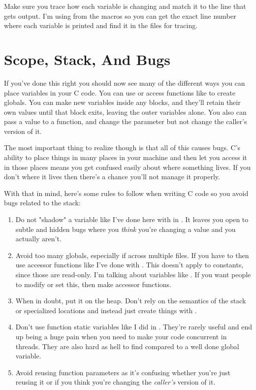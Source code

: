 Make sure you trace how each variable is changing and match it to the line
that gets output.  I'm using  from the  macros
so you can get the exact line number where each variable is printed and
find it in the files for tracing.

\section{Scope, Stack, And Bugs}

If you've done this right you should now see many of the different ways
you can place variables in your C code.  You can use  or
access functions like  to create globals.  You can make
new variables inside any blocks, and they'll retain their own values until
that block exits, leaving the outer variables alone.  You also can pass
a value to a function, and change the parameter but not change the caller's
version of it.

The most important thing to realize though is that all of this causes
bugs.  C's ability to place things in many places in your machine and then
let you access it in those places means you get confused easily about
where something lives.  If you don't where it lives then there's a chance
you'll not manage it properly.

With that in mind, here's some rules to follow when writing C code
so you avoid bugs related to the stack:

\begin{enumerate}
\item Do not "shadow" a variable like I've done here with 
    in .  It leaves you open to subtle and hidden bugs
    where you \emph{think} you're changing a value and you actually aren't.
\item Avoid too many globals, especially if across multiple files.  If you have
    to then use accessor functions like I've done with .  This
    doesn't apply to constants, since those are read-only.  I'm talking about
    variables like .  If you want people to modify or set this,
    then make accessor functions.
\item When in doubt, put it on the heap.  Don't rely on the semantics of the
    stack or specialized locations and instead just create things with
    .
\item Don't use function static variables like I did in .
    They're rarely useful and end up being a huge pain when you need to make
    your code concurrent in threads.  They are also hard as hell to find compared
    to a well done global variable.
\item Avoid reusing function parameters as it's confusing whether you're 
    just reusing it or if you think you're changing the \emph{caller's}
    version of it.
\end{enumerate}


